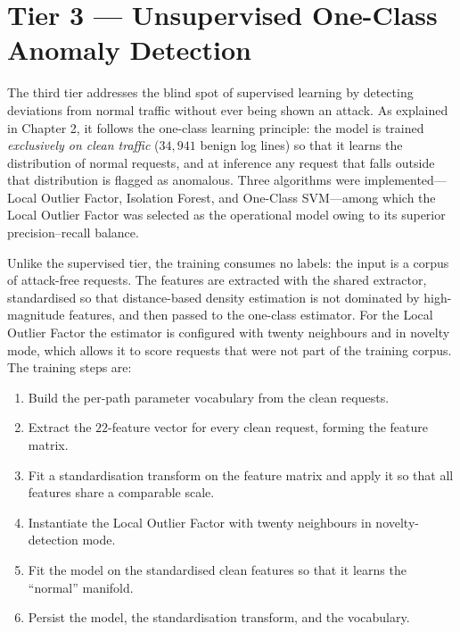 \documentclass[12pt,a4paper]{report}
\begin{document}
\section{Tier 3 --- Unsupervised One-Class Anomaly Detection}
\label{sec:tier3}

The third tier addresses the blind spot of supervised learning by detecting
deviations from normal traffic without ever being shown an attack. As
explained in Chapter 2, it follows the one-class learning
principle: the model is trained \emph{exclusively on clean traffic}
($34{,}941$ benign log lines) so that it learns the distribution of normal
requests, and at inference any request that falls outside that distribution
is flagged as anomalous. Three algorithms were implemented---Local Outlier
Factor, Isolation Forest, and One-Class SVM---among which the Local Outlier
Factor was selected as the operational model owing to its superior
precision--recall balance.

Unlike the supervised tier, the training consumes no labels: the input is a
corpus of attack-free requests. The features are extracted with the shared
extractor, standardised so that distance-based density estimation is not
dominated by high-magnitude features, and then passed to the one-class
estimator. For the Local Outlier Factor the estimator is configured with
twenty neighbours and in novelty mode, which allows it to score requests
that were not part of the training corpus. The training steps are:

\begin{enumerate}[leftmargin=1.8em, itemsep=2pt]
  \item Build the per-path parameter vocabulary from the clean requests.
  \item Extract the $22$-feature vector for every clean request, forming the
        feature matrix.
  \item Fit a standardisation transform on the feature matrix and apply it
        so that all features share a comparable scale.
  \item Instantiate the Local Outlier Factor with twenty neighbours in
        novelty-detection mode.
  \item Fit the model on the standardised clean features so that it learns
        the ``normal'' manifold.
  \item Persist the model, the standardisation transform, and the
        vocabulary.
\end{enumerate}
\end{document}
